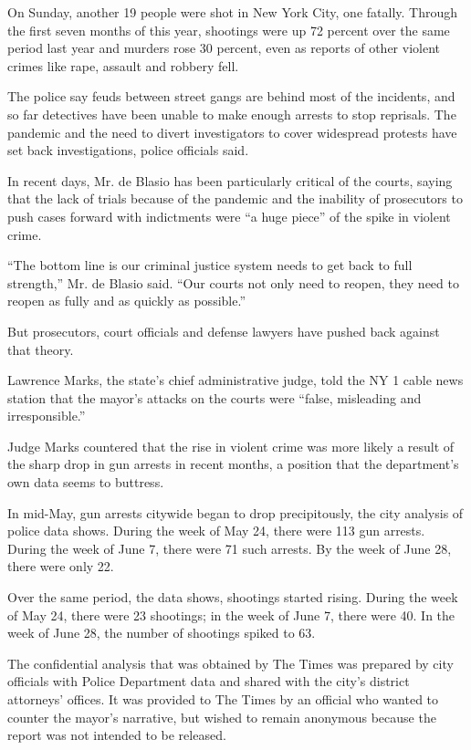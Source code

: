 On Sunday, another 19 people were shot in New York City, one fatally.
Through the first seven months of this year, shootings were up 72
percent over the same period last year and murders rose 30 percent, even
as reports of other violent crimes like rape, assault and robbery fell.

The police say feuds between street gangs are behind most of the
incidents, and so far detectives have been unable to make enough arrests
to stop reprisals. The pandemic and the need to divert investigators to
cover widespread protests have set back investigations, police officials
said.

In recent days, Mr. de Blasio has been particularly critical of the
courts, saying that the lack of trials because of the pandemic and the
inability of prosecutors to push cases forward with indictments were ``a
huge piece'' of the spike in violent crime.

``The bottom line is our criminal justice system needs to get back to
full strength,'' Mr. de Blasio said. ``Our courts not only need to
reopen, they need to reopen as fully and as quickly as possible.''

But prosecutors, court officials and defense lawyers have pushed back
against that theory.

Lawrence Marks, the state's chief administrative judge, told the NY 1
cable news station that the mayor's attacks on the courts were ``false,
misleading and irresponsible.''

Judge Marks countered that the rise in violent crime was more likely a
result of the sharp drop in gun arrests in recent months, a position
that the department's own data seems to buttress.

In mid-May, gun arrests citywide began to drop precipitously, the city
analysis of police data shows. During the week of May 24, there were 113
gun arrests. During the week of June 7, there were 71 such arrests. By
the week of June 28, there were only 22.

Over the same period, the data shows, shootings started rising. During
the week of May 24, there were 23 shootings; in the week of June 7,
there were 40. In the week of June 28, the number of shootings spiked to
63.

The confidential analysis that was obtained by The Times was prepared by
city officials with Police Department data and shared with the city's
district attorneys' offices. It was provided to The Times by an official
who wanted to counter the mayor's narrative, but wished to remain
anonymous because the report was not intended to be released.

